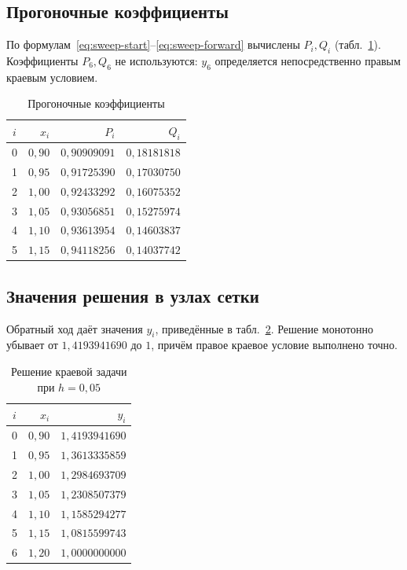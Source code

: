 \documentclass[14pt,a4paper]{extarticle}
\begin{document}
\subsection{Прогоночные коэффициенты}

По формулам~\eqref{eq:sweep-start}--\eqref{eq:sweep-forward} вычислены
$P_i,Q_i$ (табл.~\ref{tab:sweep}). Коэффициенты $P_6,Q_6$ не используются:
$y_6$ определяется непосредственно правым краевым условием.

\begin{table}[H]
    \centering
    \caption{Прогоночные коэффициенты}
    \label{tab:sweep}
    \small
    \begin{tabular}{crrr}
        \toprule
        $i$ & $x_i$ & $P_i$ & $Q_i$\\
        \midrule
        0 & $0{,}90$ & $0{,}90909091$ & $0{,}18181818$\\
        1 & $0{,}95$ & $0{,}91725390$ & $0{,}17030750$\\
        2 & $1{,}00$ & $0{,}92433292$ & $0{,}16075352$\\
        3 & $1{,}05$ & $0{,}93056851$ & $0{,}15275974$\\
        4 & $1{,}10$ & $0{,}93613954$ & $0{,}14603837$\\
        5 & $1{,}15$ & $0{,}94118256$ & $0{,}14037742$\\
        \bottomrule
    \end{tabular}
\end{table}

\subsection{Значения решения в узлах сетки}

Обратный ход даёт значения $y_i$, приведённые в табл.~\ref{tab:solution}.
Решение монотонно убывает от $1{,}4193941690$ до $1$, причём правое
краевое условие выполнено точно.

\begin{table}[H]
    \centering
    \caption{Решение краевой задачи при $h=0{,}05$}
    \label{tab:solution}
    \begin{tabular}{crr}
        \toprule
        $i$ & $x_i$ & $y_i$\\
        \midrule
        0 & $0{,}90$ & $1{,}4193941690$\\
        1 & $0{,}95$ & $1{,}3613335859$\\
        2 & $1{,}00$ & $1{,}2984693709$\\
        3 & $1{,}05$ & $1{,}2308507379$\\
        4 & $1{,}10$ & $1{,}1585294277$\\
        5 & $1{,}15$ & $1{,}0815599743$\\
        6 & $1{,}20$ & $1{,}0000000000$\\
        \bottomrule
    \end{tabular}
\end{table}
\end{document}

